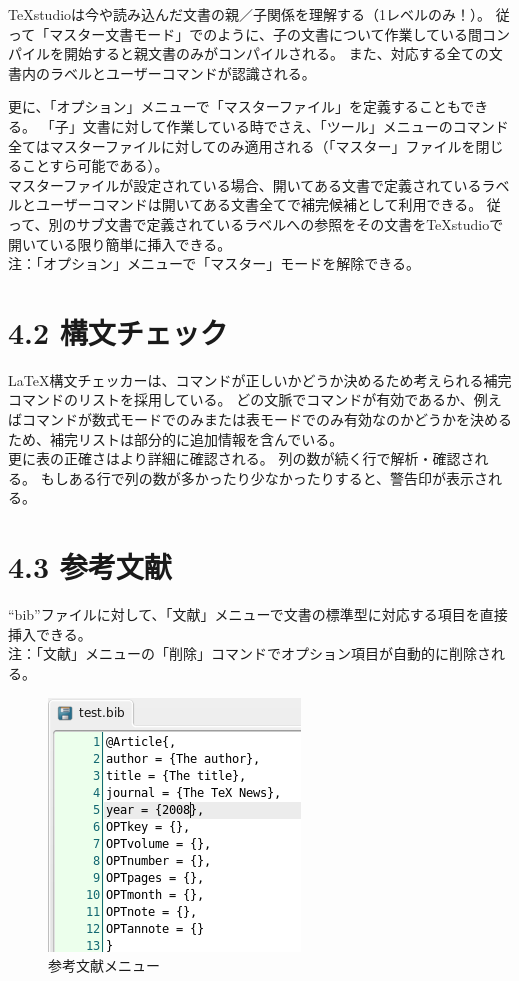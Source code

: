\documentclass[]{book}
\makeatletter
\def\maxwidth{\ifdim\Gin@nat@width>\linewidth\linewidth
\else\Gin@nat@width\fi}
\let\Oldincludegraphics\includegraphics
\renewcommand{\includegraphics}[1]{\Oldincludegraphics[width=\maxwidth]{#1}}
\makeatother
\begin{document}
TeXstudioは今や読み込んだ文書の親／子関係を理解する（1レベルのみ！）。
従って「マスター文書モード」でのように、子の文書について作業している間コンパイルを開始すると親文書のみがコンパイルされる。
また、対応する全ての文書内のラベルとユーザーコマンドが認識される。

更に、「オプション」メニューで「マスターファイル」を定義することもできる。
「子」文書に対して作業している時でさえ、「ツール」メニューのコマンド全てはマスターファイルに対してのみ適用される（「マスター」ファイルを閉じることすら可能である）。\\
マスターファイルが設定されている場合、開いてある文書で定義されているラベルとユーザーコマンドは開いてある文書全てで補完候補として利用できる。
従って、別のサブ文書で定義されているラベルへの参照をその文書をTeXstudioで開いている限り簡単に挿入できる。\\
注：「オプション」メニューで「マスター」モードを解除できる。

\section{4.2 構文チェック}

LaTeX構文チェッカーは、コマンドが正しいかどうか決めるため考えられる補完コマンドのリストを採用している。
どの文脈でコマンドが有効であるか、例えばコマンドが数式モードでのみまたは表モードでのみ有効なのかどうかを決めるため、補完リストは部分的に追加情報を含んでいる。\\
更に表の正確さはより詳細に確認される。
列の数が続く行で解析・確認される。
もしある行で列の数が多かったり少なかったりすると、警告印が表示される。

\section{4.3 参考文献}

``bib''ファイルに対して、「文献」メニューで文書の標準型に対応する項目を直接挿入できる。\\
注：「文献」メニューの「削除」コマンドでオプション項目が自動的に削除される。

\begin{figure}[htbp]
\centering
\includegraphics{doc16.png}
\caption{参考文献メニュー}
\end{figure}
\end{document}

